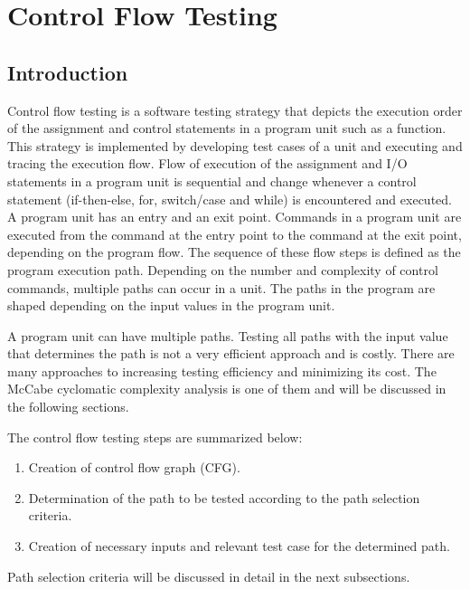 \setchapterpreamble[u]{\margintoc}
\chapter{Control Flow Testing}
\section{Introduction}
Control flow testing is a software testing  strategy that depicts the execution order of the assignment and control statements in a program unit such as a function. This strategy is implemented by developing test cases of a unit and executing and tracing the execution flow. Flow of execution of the assignment and I/O statements in a program unit is sequential and change whenever a control statement (if-then-else, for, switch/case and while) is encountered and executed. A program unit has an entry and an exit point. Commands in a program unit are executed from the command at the entry point to the command at the exit point, depending on the program flow. The sequence of these flow steps is defined as the program execution path. Depending on the number and complexity of control commands, multiple paths can occur in a unit. The paths in the program are shaped depending on the input values in the program unit.

A program unit can have multiple paths. Testing all paths with the input value that determines the path is not a very efficient approach and is costly. There are many approaches to increasing testing efficiency and minimizing its cost. The McCabe cyclomatic complexity analysis is one of them and will be discussed in the following sections.

The control flow testing steps are summarized below:
\begin{enumerate}
    \item Creation of control flow graph (CFG).
    \item Determination of the path to be tested according to the path selection criteria.
    \item Creation of necessary inputs and relevant test case for the determined path.
\end{enumerate}
Path selection criteria will be discussed in detail in the next subsections.

